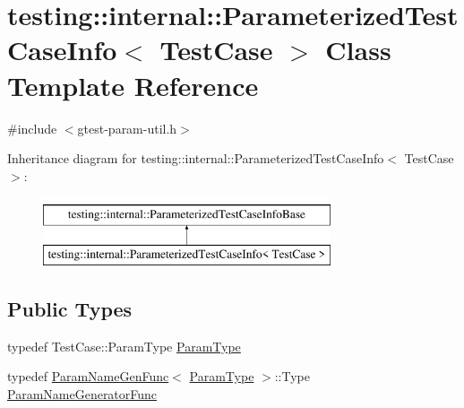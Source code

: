 \hypertarget{classtesting_1_1internal_1_1ParameterizedTestCaseInfo}{}\section{testing\+::internal\+::Parameterized\+Test\+Case\+Info$<$ Test\+Case $>$ Class Template Reference}
\label{classtesting_1_1internal_1_1ParameterizedTestCaseInfo}


{\ttfamily \#include $<$gtest-\/param-\/util.\+h$>$}

Inheritance diagram for testing\+::internal\+::Parameterized\+Test\+Case\+Info$<$ Test\+Case $>$\+:\begin{figure}[H]
\begin{center}
\leavevmode
\includegraphics[height=2.000000cm]{classtesting_1_1internal_1_1ParameterizedTestCaseInfo}
\end{center}
\end{figure}
\subsection*{Public Types}
\begin{DoxyCompactItemize}
\item 
typedef Test\+Case\+::\+Param\+Type \mbox{\hyperlink{classtesting_1_1internal_1_1ParameterizedTestCaseInfo_a643a87e178bf92a4246ce21054e44b96}{Param\+Type}}
\item 
typedef \mbox{\hyperlink{structtesting_1_1internal_1_1ParamNameGenFunc}{Param\+Name\+Gen\+Func}}$<$ \mbox{\hyperlink{classtesting_1_1internal_1_1ParameterizedTestCaseInfo_a643a87e178bf92a4246ce21054e44b96}{Param\+Type}} $>$\+::Type \mbox{\hyperlink{classtesting_1_1internal_1_1ParameterizedTestCaseInfo_aed6c5184cb8f94cec73e9d7c4b7fa2ce}{Param\+Name\+Generator\+Func}}
\end{DoxyCompactItemize}
